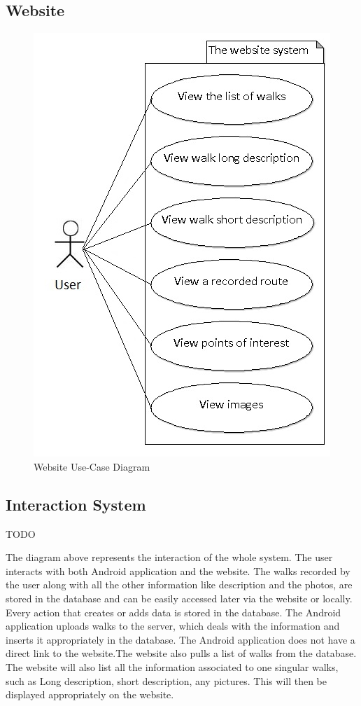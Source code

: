 \documentclass[12pt]{article}
\begin{document}
\subsection{Website}
\clearpage
\begin{figure}[htp]
\centering
\includegraphics[scale=0.60]{Project_Plan/docs/website_use_case.jpg}
\caption{Website Use-Case Diagram}
\label{Website Use-Case Diagram}
\end{figure}
\subsection{Interaction System}
\par{TODO}
\par{The diagram above represents the interaction of the whole system. The user interacts with both Android application and the website. The walks recorded by the user along with all the other information like description and the photos, are stored in the database and can be easily accessed later via the website or locally. Every action that creates or adds data is stored in the database.
The Android application uploads walks to the server, which deals with the information and inserts it appropriately in the database. The Android application does not have a direct link to the website.The website also pulls a list of walks from the database. The website will also list all the information associated to one singular walks, such as Long description, short description, any pictures. This will then be displayed appropriately on the website.}
\end{document}

